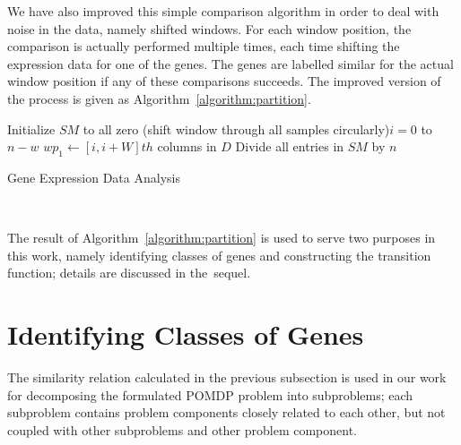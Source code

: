 We have also improved this simple comparison algorithm in order to deal with noise in the data, namely
shifted windows. For each window position, the comparison is actually performed multiple times, each time
shifting the expression data for one of the genes. The genes are labelled similar for the actual window
position if any of these comparisons succeeds. The improved version of the process is given as
Algorithm~\ref{algorithm:partition}.

{\small
\begin{algorithm}
\dontprintsemicolon
{}
Initialize $SM$ to all zero \; \For(shift window through all samples circularly){$i = 0$ to $n - w$} {
    $wp_1 \longleftarrow [i, i+W]th$ columns in $D$ \;
} Divide all entries in $SM$ by $n$ \;  \caption{Gene Expression Data Analysis}~\label{algorithm:partition}
\end{algorithm}
}

The result of Algorithm~\ref{algorithm:partition} is used to serve two purposes in this work, namely
identifying classes of genes and constructing the transition function; details are discussed in the~sequel.

\section{Identifying Classes of Genes}
The similarity relation calculated in the previous subsection is used in our work for decomposing the
formulated POMDP problem into subproblems; each subproblem contains problem components closely related to
each other, but not coupled with other subproblems and other problem component.

